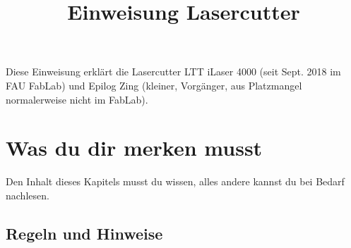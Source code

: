 \documentclass{\basedir/fablab-document}
\title{Einweisung Lasercutter}
\begin{document}
	\maketitle

	Diese Einweisung erklärt die Lasercutter LTT iLaser 4000 (seit Sept. 2018 im FAU FabLab) und Epilog Zing (kleiner, Vorgänger, aus Platzmangel normalerweise nicht im FabLab).

	\section{Was du dir merken musst}
	Den Inhalt dieses Kapitels musst du wissen, alles andere kannst du bei Bedarf nachlesen.
	\subsection{Regeln und Hinweise}
\end{document}
